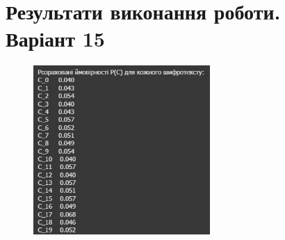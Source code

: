 \section{Результати виконання роботи. Варіант 15}
\begin{figure}[!ht]
    \centering
    \begin{minipage}{0.6\linewidth}
        \includegraphics[width=0.6\textwidth, scale=0.05]{ReportPic/report_1.png}
    \end{minipage}
\end{figure}
\newpage
